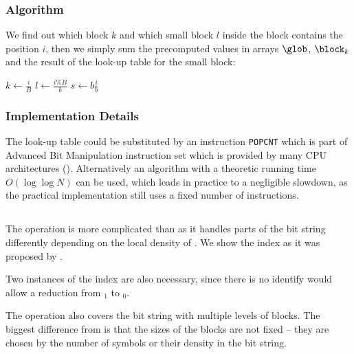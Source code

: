 \subsubsection{Algorithm}

We find out which block $k$ and which small block $l$ inside the block contains the position $i$, then we simply sum the precomputed values in arrays $\glob$, $\block_k$ and the result of the look-up table for the small block:
\begin{algorithm}
\begin{algorithmic}
	\State $k \gets \frac{i}{B}$%
	\Instr $l \gets \frac{i \% B}{b}$%
	\Instr $s \gets b \frac{i}{b}$
	\State{}
\EndFunction
\end{algorithmic}
\end{algorithm}

\subsubsection{Implementation Details}

The look-up table could be substituted by an instruction \verb|POPCNT| which is part of Advanced Bit Manipulation instruction set which is provided by many CPU architectures (\cite{intelsys}).
Alternatively an algorithm with a theoretic running time $O(\log \log N)$ can be used, which leads in practice to a negligible slowdown, as the practical implementation still uses a fixed number of instructions.

\subsection{\select}\label{ss:select}

The operation \select{} is more complicated than \rank{} as it handles parts of the bit string differently depending on the local density of \ph{}.
We show the index as it was proposed by \cite{clark1998compact}.

Two instances of the index are also necessary, since there is no identify would allow a reduction from \select$_1$ to \select$_0$.

\bigbreak

The \select{} operation also covers the bit string with multiple levels of blocks.
The biggest difference from \rank{} is that the sizes of the blocks are not fixed -- they are chosen by the number of symbols \ph{} or their density in the bit string.

